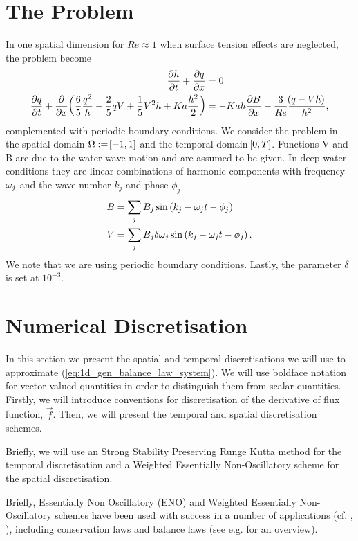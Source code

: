 \documentclass{amsart}
\theoremstyle{definition}
\theoremstyle{remark}
\numberwithin{equation}{section}
\begin{document}
\section{The Problem}
In one spatial dimension for $Re\approx 1$ when surface tension effects are neglected, the problem become
\begin{equation}
\begin{aligned}
\frac{\partial h}{\partial t} + \frac{\partial q}{\partial x}&=0\\
\frac{\partial q}{\partial t} + \frac{\partial }{\partial x}\!\left({\frac{6}{5}\frac{q^2}{h}-\frac{2}{5}qV+\frac{1}{5}V^2h+Ka\frac{h^2}{2}}\right)&=-Kah\frac{\partial B}{\partial x}-\frac{3}{Re}\frac{\!\left({q-Vh}\right)}{h^2},
\end{aligned}
\end{equation}
 complemented with periodic boundary conditions. We consider the problem in the spatial domain $\Omega:=\!\left[{-1,1}\right]$ and the temporal domain $\!\left[{0,T}\right]$. Functions V and B are due to the water wave motion and are assumed to be given.  In deep water conditions they are linear combinations of harmonic components with frequency $\omega_j$ and the wave number $k_j$ and phase $\phi_j$.
 \begin{equation}\label{eq:B_V}
\begin{aligned}
B&=\sum_jB_j\operatorname{sin}\left(k_j-\omega_jt-\phi_j\right)\\
V&=\sum_jB_j\delta\omega_j\operatorname{sin}\left(k_j-\omega_jt-\phi_j\right).
\end{aligned}
 \end{equation}
We note that we are using periodic boundary conditions.  Lastly, the parameter $\delta$ is set at $10^{-3}$.
\section{Numerical Discretisation}
In this section we present the spatial and temporal discretisations we will use to approximate (\ref{eq:1d_gen_balance_law_system}).   We will use boldface notation for  vector-valued quantities in order to distinguish them from scalar quantities.  Firstly, we will introduce conventions for discretisation of the derivative of flux function, $\vec{f}$.  Then, we will present the temporal and spatial discretisation schemes.  

Briefly, we will use an Strong Stability Preserving Runge Kutta method for the temporal discretisation and a Weighted Essentially Non-Oscillatory scheme for the spatial discretisation.  

Briefly, Essentially Non Oscillatory (ENO) and Weighted Essentially Non-Oscillatory schemes have been used with success in a number of applications (cf. \cite{jiang1996efficient}, \cite{shu1998essentially}), including conservation laws and balance laws (see e.g. \cite{shu2020essentially} for an overview).  
\end{document}
